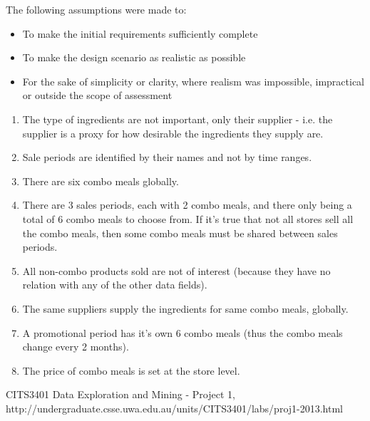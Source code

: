 \documentclass[12pt, a4paper]{article}
\begin{document}
The following assumptions were made to:

\begin{itemize}
	\item To make the initial requirements \cite{designdoc} sufficiently complete
	\item To make the design scenario as realistic as possible 
	\item For the sake of simplicity or clarity, where realism was impossible, impractical or outside the scope of assessment
\end{itemize}

\begin{enumerate}
	\item The type of ingredients are not important, only their supplier - i.e. the supplier is a proxy for how desirable the ingredients they supply are. 
	\item Sale periods are identified by their names and not by time ranges.
	\item There are six combo meals globally.
	\item There are 3 sales periods, each with 2 combo meals, and there only being a total of 6 combo meals to choose from. If it’s true that not all stores sell all the combo meals, then some combo meals must be shared between sales periods.
	\item All non-combo products sold are not of interest (because they have no relation with any of the other data fields).
	\item The same suppliers supply the ingredients for same combo meals, globally.
	\item A promotional period has it’s own 6 combo meals (thus the combo meals change every 2 months).
	\item The price of combo meals is set at the store level.
\end{enumerate}

\begin{thebibliography}{9}

	CITS3401 Data Exploration and Mining - Project 1,
	http://undergraduate.csse.uwa.edu.au/units/CITS3401/labs/proj1-2013.html
		
\end{thebibliography}


\end{document}
